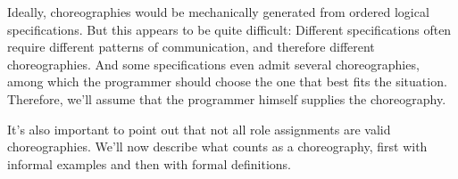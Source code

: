 \documentclass[
  class=../hdeyoung-proposal,
  crop=false
]{standalone}
\begin{document}
Ideally, choreographies would be mechanically generated from ordered logical specifications.
But this appears to be quite difficult:
Different specifications often require different patterns of communication, and therefore different choreographies.
And some specifications even admit several choreographies, among which the programmer should choose the one that best fits the situation.
Therefore, we'll assume that the programmer himself supplies the choreography.

It's also important to point out that not all role assignments are valid choreographies.
We'll now describe what counts as a choreography, first with informal examples and then with formal definitions.







\end{document}
